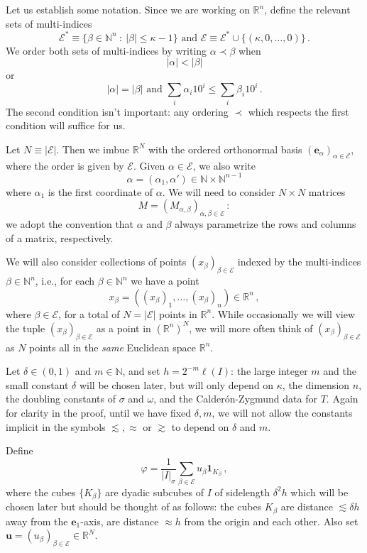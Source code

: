 \documentclass{amsart}%
\theoremstyle{plain}
\numberwithin{equation}{section}
\begin{document}
 Let us establish some notation. Since we are working on $\mathbb{R}^n$, define the relevant sets of multi-indices 
\[
	\mathcal{E}^* \equiv \{ \beta \in \mathbb{N}^n~:~ |\beta| \leq \kappa-1 \} \text{ and } \mathcal{E} \equiv \mathcal{E} ^* \cup \{ (\kappa, 0,\ldots, 0)\} \, . \] We order both sets of multi-indices by writing $\alpha \prec \beta$ when 
\[
	 |\alpha| < |\beta|
 \]
 or
 \[
	|\alpha| = |\beta| \text{ and } \sum\limits_i  \alpha_i 10^i \leq \sum\limits_i \beta_i 10^i  \, . 
\]
The second condition isn't important: any ordering $\prec$ which respects the first condition will suffice for us. 

Let $N \equiv \left | \mathcal{E} \right |$. Then we imbue $\mathbb{R}^{N}$ with the ordered orthonormal basis $\left ( \mathbf{e}_{\alpha} \right )_{\alpha \in \mathcal{E}}$, where the order is given by $\mathcal{E}$. Given $\alpha \in \mathcal{E}$, we also write  
\[
	\alpha = (\alpha_1, \alpha') \in \mathbb{N} \times \mathbb{N}^{n-1}
\]
where $\alpha_1$ is the first coordinate of $\alpha$. We will need to consider $N \times N$ matrices  
\[
	M = \left ( M_{\alpha, \beta} \right )_{\alpha, \beta \in \mathcal{E}} \, :
\]
we adopt the convention that $\alpha$ and $\beta$ always parametrize the rows and columns of a matrix, respectively.

We will also consider collections of points $(x_{\beta})_{\beta \in \mathcal{E} }$ indexed by the multi-indices $\beta \in \mathbb{N}^n$, i.e., for each $\beta \in \mathbb{N}^n$ we have a point 
\[
	x_{\beta} = \left ( (x_{\beta})_1 ,\ldots , (x_{\beta})_n \right ) \in \mathbb{R}^n \, ,
\] where $\beta \in \mathcal{E}$, for a total of $N = |\mathcal{E}|$ points in $\mathbb{R}^n$. While occasionally we will view the tuple $ (x_{\beta})_{\beta \in \mathcal{E}}$ as a point in $\left ( \mathbb{R}^n \right )^{N}$, we will more often think of $(x_{\beta})_{\beta \in \mathcal{E}}$ as $N$ points all in the \emph{same} Euclidean space $\mathbb{R}^n$.

Let $\delta \in \left (0, 1 \right )$ and $m \in \mathbb{N}$, and set $h = 2^{-m} \ell \left ( I \right)$: the large integer $m$ and the small constant $\delta$ will be chosen later, but will only depend on $\kappa$, the dimension $n$, the doubling constants of $\sigma$ and $\omega$, and the Calder\'on-Zygmund data for $T$. Again for clarity in the proof, until we have fixed $\delta, m$, we will not allow the constants implicit in the symbols $\lesssim , \approx$ or $\gtrsim$ to depend on $\delta$ and $m$.

Define 
\[
	\varphi = \frac{1}{\left | I \right|_{\sigma}} \sum\limits_{\beta \in \mathcal{E}} u_{\beta} \mathbf{1}_{K_{\beta}} \, ,
\]
where the cubes $\{ K_{\beta}\}$ are dyadic subcubes of $I$ of sidelength $\delta^2 h$ which will be chosen later but should be thought of as follows: the cubes $K_{\beta}$ are distance $\lesssim \delta h$ away from the $\mathbf{e}_1$-axis, are distance $\approx h$ from the origin and each other. Also set $\mathbf{u} = \left (u_{\beta} \right )_{\beta \in \mathcal{E}} \in \mathbb{R}^N$.
\end{document}
